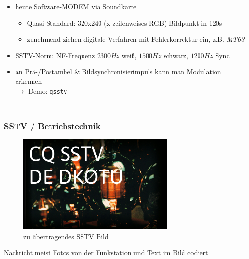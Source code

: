 \begin{frame}
\begin{columns}
    \begin{itemize}
      \item heute Software-MODEM via Soundkarte
        \begin{itemize}
          \item Quasi-Standard: 320x240 (x zeilenweises RGB) Bildpunkt in 120s
          \item zunehmend ziehen digitale Verfahren mit Fehlerkorrektur ein,
            z.B. \emph{MT63} \hyperlink{refs}{\cite{wp}}
        \end{itemize}
      \item SSTV-Norm: NF-Frequenz $2300 Hz$ weiß, $1500 Hz$ schwarz, $1200 Hz$ Sync
      \item an Prä-/Postambel \& Bildsynchronisierimpuls kann man Modulation erkennen \\
        \centering $\rightarrow$ Demo: \texttt{qsstv}
    \end{itemize}
  \end{columns}

\end{frame}

\begin{frame}
  \frametitle{SSTV / Betriebstechnik}

  \begin{center}
    \begin{figure}
      \includegraphics[width=0.7\textwidth,height=.6\textheight,keepaspectratio]{e16/Transmittingtubes.jpg}
      \caption{zu übertragendes SSTV Bild}
    \end{figure}
  \end{center}


  Nachricht meist Fotos von der Funkstation und Text im Bild codiert

\end{frame}

